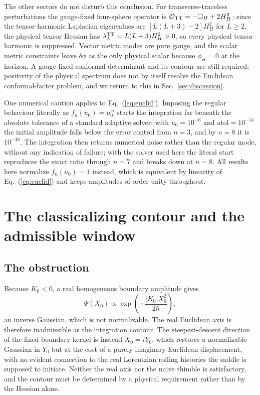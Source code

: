 \documentclass[aps,prd,twocolumn,superscriptaddress,nofootinbib,longbibliography]{revtex4-2}
\begin{document}
The other sectors do not disturb this conclusion. For transverse-traceless
perturbations the gauge-fixed four-sphere operator is
$\mathcal{O}_{\rm TT}=-\Box_H+2H_H^2$; since the tensor-harmonic Laplacian
eigenvalues are $[L(L+3)-2]H_H^2$ for $L\ge2$, the physical tensor Hessian
has $\lambda_L^{\rm TT}=L(L+3)H_H^2>0$, so every physical tensor harmonic is
suppressed. Vector metric modes are pure gauge, and the scalar metric
constraints leave $\delta\phi$ as the only physical scalar because
$\dot\phi_H=0$ at the horizon. A gauge-fixed conformal determinant and its
contour are still required; positivity of the physical spectrum does not by
itself resolve the Euclidean conformal-factor problem, and we return to this
in Sec.~\ref{sec:discussion}.

One numerical caution applies to Eq.~(\ref{eq:euclid}). Imposing the
regular behaviour literally as $f_n(u_0)=u_0^{\,n}$ starts the
integration far beneath the absolute tolerance of a standard adaptive
solver: with $u_0=10^{-6}$ and $\mathrm{atol}=10^{-14}$ the initial
amplitude falls below the error control from $n=3$, and by $n=8$ it is
$10^{-48}$. The integration then returns numerical noise rather than the
regular mode, without any indication of failure; with the solver used
here the literal start reproduces the exact ratio through $n=7$ and
breaks down at $n=8$. All results here normalize $f_n(u_0)=1$
instead, which is equivalent by linearity of Eq.~(\ref{eq:euclid}) and keeps
amplitudes of order unity throughout.

\section{The classicalizing contour and the admissible window}
\label{sec:thimble}

\subsection{The obstruction}
Because $K_0<0$, a real homogeneous boundary amplitude gives
\begin{equation}
\Psi(X_0)\propto\exp\!\left(+\frac{|K_0|X_0^2}{2\hbar}\right),
\end{equation}
an inverse Gaussian, which is not normalizable. The real Euclidean axis is
therefore inadmissible as the integration contour. The steepest-descent
direction of the fixed boundary kernel is instead $X_0=iY_0$, which restores
a normalizable Gaussian in $Y_0$ but at the cost of a purely imaginary
Euclidean displacement, with no evident connection to the real Lorentzian
rolling histories the saddle is supposed to initiate. Neither the real axis
nor the naive thimble is satisfactory, and the contour must be determined by
a physical requirement rather than by the Hessian alone.
\end{document}
